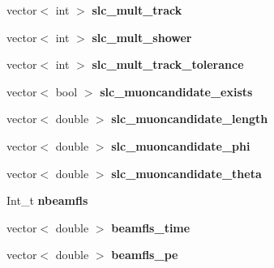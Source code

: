 \begin{DoxyCompactItemize}
\item 
\hypertarget{classUBXSecEvent_a2fe1b939fcaf6ffbeb68c8879239c2c0}{vector$<$ int $>$ {\bfseries slc\-\_\-mult\-\_\-track}}\label{classUBXSecEvent_a2fe1b939fcaf6ffbeb68c8879239c2c0}

\item 
\hypertarget{classUBXSecEvent_aaf02413b3f000c45ecaf8aafa9d4e9be}{vector$<$ int $>$ {\bfseries slc\-\_\-mult\-\_\-shower}}\label{classUBXSecEvent_aaf02413b3f000c45ecaf8aafa9d4e9be}

\item 
\hypertarget{classUBXSecEvent_ab49b7199fe07b6ed85017048b685d7bb}{vector$<$ int $>$ {\bfseries slc\-\_\-mult\-\_\-track\-\_\-tolerance}}\label{classUBXSecEvent_ab49b7199fe07b6ed85017048b685d7bb}

\item 
\hypertarget{classUBXSecEvent_a77d7addc1e52f51c7697daab275c8bc6}{vector$<$ bool $>$ {\bfseries slc\-\_\-muoncandidate\-\_\-exists}}\label{classUBXSecEvent_a77d7addc1e52f51c7697daab275c8bc6}

\item 
\hypertarget{classUBXSecEvent_aed08b3fea158e50f1f878bb211e7abb6}{vector$<$ double $>$ {\bfseries slc\-\_\-muoncandidate\-\_\-length}}\label{classUBXSecEvent_aed08b3fea158e50f1f878bb211e7abb6}

\item 
\hypertarget{classUBXSecEvent_a99414e0a0e74aaeac78fa019f53f4760}{vector$<$ double $>$ {\bfseries slc\-\_\-muoncandidate\-\_\-phi}}\label{classUBXSecEvent_a99414e0a0e74aaeac78fa019f53f4760}

\item 
\hypertarget{classUBXSecEvent_a8b3d8a8475d7c283fad2d1d4e6a85dca}{vector$<$ double $>$ {\bfseries slc\-\_\-muoncandidate\-\_\-theta}}\label{classUBXSecEvent_a8b3d8a8475d7c283fad2d1d4e6a85dca}

\item 
\hypertarget{classUBXSecEvent_a2bf72740213db9d50d45c603eb3c549e}{Int\-\_\-t {\bfseries nbeamfls}}\label{classUBXSecEvent_a2bf72740213db9d50d45c603eb3c549e}

\item 
\hypertarget{classUBXSecEvent_aff5ca08ec3a193029979e23b73d49d85}{vector$<$ double $>$ {\bfseries beamfls\-\_\-time}}\label{classUBXSecEvent_aff5ca08ec3a193029979e23b73d49d85}

\item 
\hypertarget{classUBXSecEvent_a3d703c077ccb0b00cacd04c6e751a2eb}{vector$<$ double $>$ {\bfseries beamfls\-\_\-pe}}\label{classUBXSecEvent_a3d703c077ccb0b00cacd04c6e751a2eb}


\end{DoxyCompactItemize}
